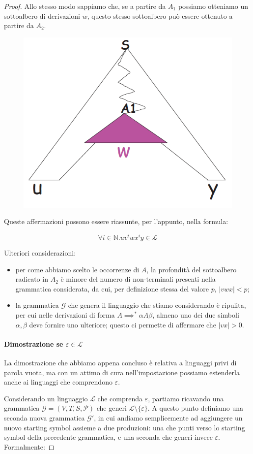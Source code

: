 \documentclass[class=book, crop=false, oneside]{standalone}
\begin{document}
\begin{proof}
  Allo stesso modo sappiamo che, se a partire da \(A_1\) possiamo otteniamo un sottoalbero di derivazioni \(w\), questo stesso sottoalbero può essere ottenuto a partire da \(A_2\).

  \begin{figure}
    \centering
    \includegraphics[width=.25\textwidth,keepaspectratio]{pl-proof_5}
  \end{figure}

  Queste affermazioni possono essere riassunte, per l'appunto, nella formula:

  \begin{equation*}
    \forall i \in \mathbb{N}.uv^iwx^iy \in \mathcal{L}
  \end{equation*}

  Ulteriori considerazioni:
   \begin{itemize}
     \item per come abbiamo scelto le occorrenze di \(A\), la profondità del sottoalbero radicato in \(A_2\) è minore del numero di non-terminali presenti nella grammatica considerata, da cui, per definizione stessa del valore \(p\), \(|vwx| < p\);
     \item la grammatica \(\mathcal{G}\) che genera il linguaggio che stiamo considerando è ripulita, per cui nelle derivazioni di forma \(A \implies^* \alpha A \beta\), almeno uno dei due simboli \(\alpha, \beta\) deve fornire uno ulteriore; questo ci permette di affermare che \(|vx| > 0\).
   \end{itemize}

   \paragraph{Dimostrazione se \(\varepsilon \in \mathcal{L}\)}
   La dimostrazione che abbiamo appena concluso è relativa a linguaggi privi di parola vuota, ma con un attimo di cura nell'impostazione possiamo estenderla anche ai linguaggi che comprendono \(\varepsilon\).

   Considerando un linguaggio \(\mathcal{L}\) che comprenda \(\varepsilon\), partiamo ricavando una grammatica \(\mathcal{G} = (V, T, S, \mathcal{P})\) che generi \(\mathcal{L} \setminus \{\varepsilon\}\). A questo punto definiamo una seconda nuova grammatica \(\mathcal{G}'\), in cui andiamo semplicemente ad aggiungere un nuovo starting symbol assieme a due produzioni: una che punti verso lo starting symbol della precedente grammatica, e una seconda che generi invece \(\varepsilon\). Formalmente:


\end{proof}
\end{document}
